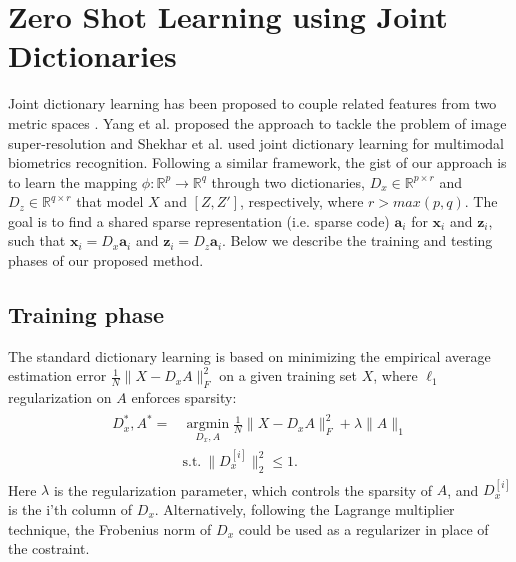 \documentclass[letterpaper]{article} %
\def\x{\mathbf{x}}
\def\a{\mathbf{a}}
\def\z{\mathbf{z}}
\begin{document}
\section{Zero Shot Learning using Joint Dictionaries}
\label{sec:jointDL}


Joint dictionary learning has been proposed to couple related features from two   metric spaces \cite{yang2010image,shekhar2014joint}.  Yang et al. \cite{yang2010image} proposed the approach to tackle the problem of image super-resolution and Shekhar et al. \cite{shekhar2014joint} used joint dictionary learning for multimodal biometrics recognition. Following a similar framework, the gist of our approach is to learn the  mapping  $\phi:\mathbb{R}^p\rightarrow \mathbb{R}^q$ through two dictionaries, $D_x\in\mathbb{R}^{p\times r}$ and $D_z\in \mathbb{R}^{q\times r}$  that model $X$ and $[Z,Z']$, respectively, where $r>max(p,q)$. The goal is to find a shared sparse representation (i.e. sparse code) $\a_i$ for $\x_i$ and $\z_i$, such that $\x_i=D_x\a_i$ and $\z_i=D_z\a_i$. Below we describe the training and testing phases of our proposed method.

\subsection{Training phase}

The standard dictionary learning is based on minimizing the empirical average estimation error $\frac{1}{N}\|X-D_xA\|^2_F$ on a given training set $X$, where $\ell_1$ regularization on $A$ enforces sparsity:
\begin{eqnarray}
\begin{split}
 D^*_x,A^* =  & \operatorname*{argmin}_{D_x,A} \frac{1}{N}\|X-D_xA\|^2_F+\lambda\|A\|_1  \\
 &\text{s.t.}~ \|D^{[i]}_x\|^2_2 \leq 1.
  \end{split}
\label{eq:mainDx}
\end{eqnarray}  
Here $\lambda$ is the regularization parameter, which controls the sparsity of $A$, and $D_x^{[i]}$ is the i'th column of $D_x$. Alternatively, following the Lagrange multiplier technique, the Frobenius norm of $D_x$ could be used as a regularizer in place of the costraint.
\end{document}
